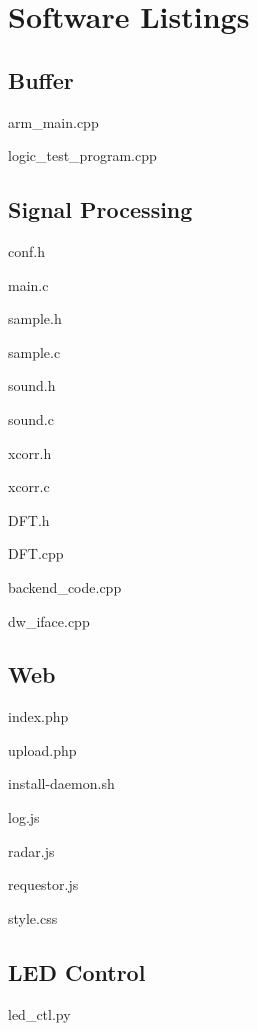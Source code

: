 \documentclass[a4paper]{article}
\begin{document}
\section{Software Listings}

\subsection{Buffer}
arm\_main.cpp


logic\_test\_program.cpp


\subsection{Signal Processing}
conf.h


main.c


sample.h


sample.c


sound.h


sound.c


xcorr.h


xcorr.c


DFT.h


DFT.cpp


backend\_code.cpp


dw\_iface.cpp


\subsection{Web}
index.php


upload.php


install-daemon.sh


log.js


radar.js


requestor.js


style.css


\subsection{LED Control}
led\_ctl.py

\end{document}
